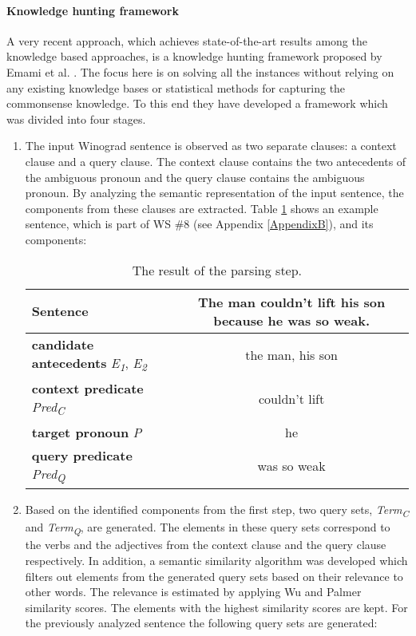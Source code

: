 \paragraph{Knowledge hunting framework}
A very recent approach, which achieves state-of-the-art results among the knowledge based approaches, is a knowledge hunting framework proposed by Emami et al. \cite{DBLP:conf/emnlp/EmamiCTSC18}. The focus here is on solving all the instances without relying on any existing knowledge bases or statistical methods for capturing the commonsense knowledge. To this end they have developed a framework which was divided into four stages.
\begin{enumerate}
	\item The input Winograd sentence is observed as two separate clauses: a context clause and a query clause. The context clause contains the two antecedents of the ambiguous pronoun and the query clause contains the ambiguous pronoun. By analyzing the semantic representation of the  input sentence, the components from these clauses are extracted. Table \ref{TableEmami} shows an example sentence, which is part of WS \#8 (see Appendix \ref{AppendixB}), and its components:	

	\begin{table}[h!]
			\begin{center}
	\begin{tabular} {l| c}
	 \textbf{Sentence} &The man couldn’t lift his son because he was so weak. \\\hline
	 \textbf{candidate antecedents} \textit{E\textsubscript{1}}, \textit{E\textsubscript{2}} & the man, his son\\\hline
	 \textbf{context predicate} \textit{Pred\textsubscript{C}} & couldn’t lift \\\hline
	 \textbf{target pronoun} \textit{P} & he \\\hline
	 \textbf{query predicate} \textit{Pred\textsubscript{Q}} & was so weak
	 	
	\end{tabular}
	\caption{{\label{TableEmami}}The result of the parsing step.}
		\end{center}
	\end{table}

	\item Based on the identified components from the first step, two query sets, \textit{Term\textsubscript{C}} and \textit{Term\textsubscript{Q}}, are generated. The elements in these query sets correspond to the verbs and the adjectives from the context clause and the query clause respectively. In addition, a semantic similarity algorithm was developed which filters out elements from the generated query sets based on their relevance to other words. The relevance is estimated by applying Wu and Palmer \cite{Wu} similarity scores. The elements with the highest similarity scores are kept. 
	For the previously analyzed sentence the following query sets are generated:
	

\end{enumerate}
